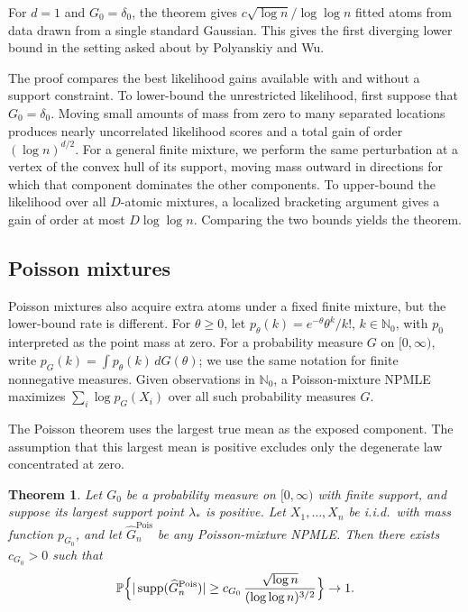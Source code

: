 \documentclass[11pt]{article}
\newtheorem{theorem}{Theorem}[section]
\theoremstyle{definition}
\numberwithin{equation}{section}
\newcommand{\wh}{\widehat}
\DeclareMathOperator{\supp}{supp}
\begin{document}
For \(d=1\) and \(G_0=\delta_0\), the theorem gives
\(c\sqrt{\log n}/\log\log n\) fitted atoms from data drawn from a single
standard Gaussian. This gives the first diverging lower bound in the setting
asked about by Polyanskiy and Wu.

The proof compares the best likelihood gains available with and without a
support constraint. To lower-bound the unrestricted likelihood, first suppose
that \(G_0=\delta_0\). Moving small amounts of mass from zero to many separated
locations produces nearly uncorrelated likelihood scores and a total gain of
order \((\log n)^{d/2}\). For a general finite mixture, we perform the same
perturbation at a vertex of the convex hull of its support, moving mass outward
in directions for which that component dominates the other components. To
upper-bound the likelihood over all \(D\)-atomic mixtures, a localized
bracketing argument gives a gain of order at most \(D\log\log n\). Comparing
the two bounds yields the theorem.

\subsection*{Poisson mixtures}

Poisson mixtures also acquire extra atoms under a fixed finite mixture, but
the lower-bound rate is different. For \(\theta\ge0\), let
\(p_\theta(k)=e^{-\theta}\theta^k/k!\), \(k\in\mathbb N_0\), with
\(p_0\) interpreted as the point mass at zero. For a probability measure
\(G\) on \([0,\infty)\), write
\(p_G(k)=\int p_\theta(k)\,dG(\theta)\); we use the same notation for finite
nonnegative measures. Given observations in \(\mathbb N_0\), a
Poisson-mixture NPMLE maximizes \(\sum_i\log p_G(X_i)\) over all such
probability measures \(G\).

The Poisson theorem uses the largest true mean as the exposed component. The assumption that this largest mean is positive excludes only the degenerate law concentrated at zero.

\begin{theorem}
\label{thm:poisson-finite-main}
Let $G_0$ be a probability measure on $[0,\infty)$ with finite support, and suppose its largest support point $\lambda_*$ is positive. Let $X_1,\dots,X_n$ be i.i.d.\ with mass function $p_{G_0}$, and let $\wh G_n^{\mathrm{Pois}}$ be any Poisson-mixture NPMLE. Then there exists $c_{G_0}>0$ such that
\[
    \mathbb P\Bigl\{
        |\supp(\wh G_n^{\mathrm{Pois}})|
        \ge
        c_{G_0}\,\frac{\sqrt{\log n}}{(\log\log n)^{3/2}}
    \Bigr\}\to1.
\]
\end{theorem}
\end{document}
